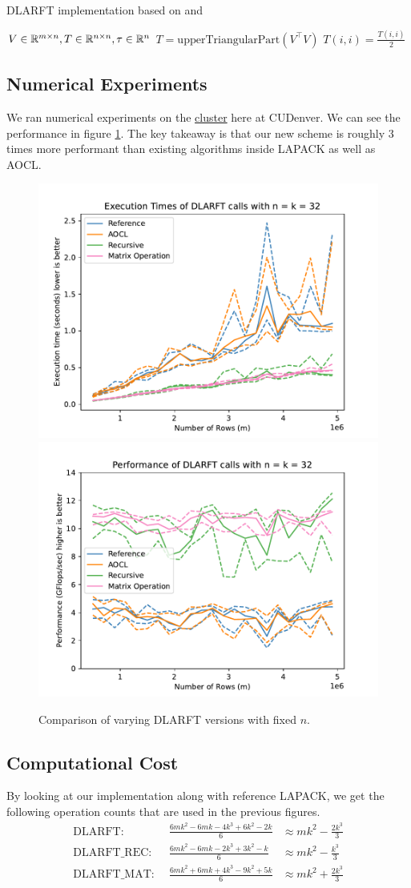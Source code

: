 \documentclass[12pt]{article}
\begin{document}
    \begin{algorithm}
        \caption{DLARFT implementation based on \cite{Joff} and \cite{Puglisi}}\label{alg:UTDLARFT}
        \begin{algorithmic}[1]
            \REQUIRE $V\in\mathbb{R}^{m\times n}, T\in\mathbb{R}^{n\times n}, \tau\in\mathbb{R}^n$\hfill{}
            \STATE $T = \text{upperTriangularPart}\left(V^\top V\right)$
                \STATE $T(i,i) = \frac{T(i,i)}{2}$
            \ENDFOR
        \end{algorithmic}
    \end{algorithm}

    \subsection{Numerical Experiments}
    We ran numerical experiments on the \href{https://ccm-docs.readthedocs.io/en/latest/alderaan/#hardware}{cluster}
    here at CUDenver. We can see the performance in figure \ref{fig:DLARFT}. The key takeaway is that our new
    scheme is roughly 3 times more performant than existing algorithms inside LAPACK as well as AOCL.
    \begin{figure}
        \centering
        \includegraphics[width=.45\textwidth]{figures/timeDLARFT.pdf}
        \includegraphics[width=.45\textwidth]{figures/flopDLARFT.pdf}
        \caption{Comparison of varying DLARFT versions with fixed $n$.}\label{fig:DLARFT}
    \end{figure}
    \subsection{Computational Cost}
    By looking at our implementation along with reference LAPACK, we get the following operation counts that are
    used in the previous figures.
    \[
    \begin{aligned}
            \text{DLARFT: }&\,      \frac{6mk^2 - 6mk -4k^3 +6k^2 - 2k}{6}&\approx mk^2 - \frac{2k^3}{3}\\
            \text{DLARFT\_REC: }&\, \frac{6mk^2 - 6mk -2k^3 +3k^2 -  k}{6}&\approx mk^2 - \frac{k^3}{3}\\
            \text{DLARFT\_MAT: }&\, \frac{6mk^2 + 6mk +4k^3 -9k^2 + 5k}{6}&\approx mk^2 + \frac{2k^3}{3}
    \end{aligned}
    \]
\end{document}
